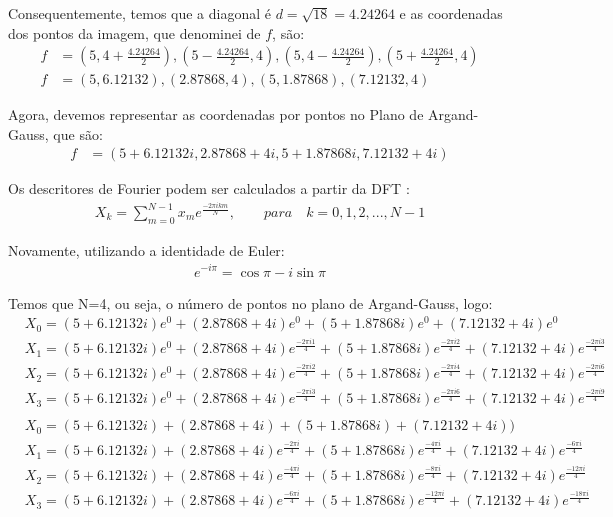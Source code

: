 \documentclass[12pt]{article}
\begin{document}
\begin{itemize}
\begin{itemize}
Consequentemente, temos que a diagonal é $d = \sqrt{18} = 4.24264$ e as coordenadas dos pontos da imagem, que denominei de $f$, são:
\begin{align*}
    f &= (5, 4 + \frac{4.24264}{2}), (5 - \frac{4.24264}{2}, 4), (5, 4 - \frac{4.24264}{2}), (5 + \frac{4.24264}{2}, 4) \\
    f &= (5, 6.12132), (2.87868, 4), (5, 1.87868), (7.12132, 4)
\end{align*}
    
Agora, devemos representar as coordenadas por pontos no Plano de Argand-Gauss, que são:
\begin{align*}
    f &= (5 + 6.12132i, 2.87868 + 4i, 5 + 1.87868i, 7.12132 + 4i)
\end{align*}

Os descritores de Fourier podem ser calculados a partir da DFT \cite{broughton2009discrete}:
\begin{align*}
    X_k = \sum\limits_{m=0}^{N-1} x_m e^{\frac{-2\pi ikm}{N}},\qquad para\quad k=0,1,2,...,N-1
\end{align*}

Novamente, utilizando a identidade de Euler:
\begin{align*}
    e^{-i \pi} = \cos \pi - i\sin\pi
\end{align*}
	  
Temos que N=4, ou seja, o número de pontos no plano de Argand-Gauss, logo:
\begin{align*}
    &X_0 = (5 + 6.12132i)e^0 + (2.87868 + 4i)e^0 + (5 + 1.87868i)e^0 + (7.12132 + 4i)e^0 &\\
    &X_1 = (5 + 6.12132i)e^0 + (2.87868 + 4i)e^{\frac{-2\pi i1}{4}} + (5 + 1.87868i)e^{\frac{-2\pi i2}{4}} + (7.12132 + 4i)e^{\frac{-2\pi i3}{4}} &\\
    &X_2 = (5 + 6.12132i)e^0 + (2.87868 + 4i)e^{\frac{-2\pi i2}{4}} + (5 + 1.87868i)e^{\frac{-2\pi i4}{4}} + (7.12132 + 4i)e^{\frac{-2\pi i6}{4}} &\\
    &X_3 = (5 + 6.12132i)e^0 + (2.87868 + 4i)e^{\frac{-2\pi i3}{4}} + (5 + 1.87868i)e^{\frac{-2\pi i6}{4}} + (7.12132 + 4i)e^{\frac{-2\pi i9}{4}} &\\
    \\
    &X_0 = (5 + 6.12132i) + (2.87868 + 4i) + (5 + 1.87868i) + (7.12132 + 4i)) &\\
    &X_1 = (5 + 6.12132i) + (2.87868 + 4i)e^{\frac{-2\pi i}{4}} + (5 + 1.87868i)e^{\frac{-4\pi i}{4}} + (7.12132 + 4i)e^{\frac{-6\pi i}{4}} &\\
    &X_2 = (5 + 6.12132i) + (2.87868 + 4i)e^{\frac{-4\pi i}{4}} + (5 + 1.87868i)e^{\frac{-8\pi i}{4}} + (7.12132 + 4i)e^{\frac{-12\pi i}{4}} &\\
    &X_3 = (5 + 6.12132i) + (2.87868 + 4i)e^{\frac{-6\pi i}{4}} + (5 + 1.87868i)e^{\frac{-12\pi i}{4}} + (7.12132 + 4i)e^{\frac{-18\pi i}{4}} &
\end{align*}


\end{itemize}
\end{itemize}
\end{document}
